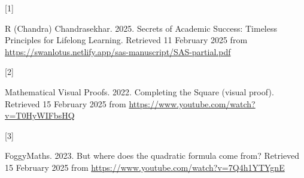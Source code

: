 \documentclass[
  a4paper,
]{article}
\newlength{\cslhangindent}
\newlength{\csllabelwidth}
\newenvironment{CSLReferences}[2] %
 {\begin{list}{}{%
  \setlength{\itemindent}{0pt}
  \setlength{\leftmargin}{0pt}
  \setlength{\parsep}{0pt}
  \ifodd #1
   \setlength{\leftmargin}{\cslhangindent}
   \setlength{\itemindent}{-1\cslhangindent}
  \fi
  \setlength{\itemsep}{#2\baselineskip}}}
 {\end{list}}
\newcommand{\CSLLeftMargin}[1]{\parbox[t]{\csllabelwidth}{\strut#1\strut}}
\newcommand{\CSLRightInline}[1]{\parbox[t]{\linewidth - \csllabelwidth}{\strut#1\strut}}
\begin{document}
\label{refs}
\begin{CSLReferences}{0}{0}
\CSLLeftMargin{{[}1{]} }%
\CSLRightInline{R (Chandra) Chandrasekhar. 2025. {Secrets of Academic
Success}: {Timeless Principles for Lifelong Learning}. Retrieved 11
February 2025 from
\url{https://swanlotus.netlify.app/sas-manuscript/SAS-partial.pdf}}

\CSLLeftMargin{{[}2{]} }%
\CSLRightInline{Mathematical Visual Proofs. 2022. {Completing the Square
(visual proof)}. Retrieved 15 February 2025 from
\url{https://www.youtube.com/watch?v=T0HyWIFbsHQ}}

\CSLLeftMargin{{[}3{]} }%
\CSLRightInline{FoggyMaths. 2023. {But where does the quadratic formula
come from?} Retrieved 15 February 2025 from
\url{https://www.youtube.com/watch?v=7Q4h1YTYgnE}}

\end{CSLReferences}
\end{document}
